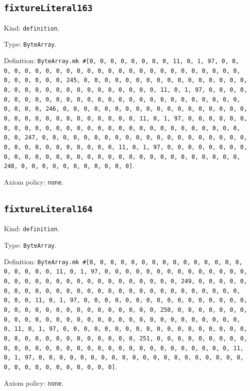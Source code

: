 \documentclass[11pt]{article}
\begin{document}
\subsection*{\texttt{fixtureLiteral163}}
\noindent Kind: \texttt{definition}.\par
\noindent Type: \texttt{ByteArray}.\par
\noindent Definition: \texttt{ByteArray.mk \#[0, 0, 0, 0, 0, 0, 0, 0, 11, 0, 1, 97, 0, 0, 0, 0, 0, 0, 0, 0, 0, 0, 0, 0, 0, 0, 0, 0, 0, 0, 0, 0, 0, 0, 0, 0, 0, 0, 0, 0, 0, 0, 0, 245, 0, 0, 0, 0, 0, 0, 0, 0, 0, 0, 0, 0, 0, 0, 0, 0, 0, 0, 0, 0, 0, 0, 0, 0, 0, 0, 0, 0, 0, 0, 0, 11, 0, 1, 97, 0, 0, 0, 0, 0, 0, 0, 0, 0, 0, 0, 0, 0, 0, 0, 0, 0, 0, 0, 0, 0, 0, 0, 0, 0, 0, 0, 0, 0, 0, 0, 246, 0, 0, 0, 0, 0, 0, 0, 0, 0, 0, 0, 0, 0, 0, 0, 0, 0, 0, 0, 0, 0, 0, 0, 0, 0, 0, 0, 0, 0, 0, 0, 11, 0, 1, 97, 0, 0, 0, 0, 0, 0, 0, 0, 0, 0, 0, 0, 0, 0, 0, 0, 0, 0, 0, 0, 0, 0, 0, 0, 0, 0, 0, 0, 0, 0, 0, 247, 0, 0, 0, 0, 0, 0, 0, 0, 0, 0, 0, 0, 0, 0, 0, 0, 0, 0, 0, 0, 0, 0, 0, 0, 0, 0, 0, 0, 0, 0, 0, 11, 0, 1, 97, 0, 0, 0, 0, 0, 0, 0, 0, 0, 0, 0, 0, 0, 0, 0, 0, 0, 0, 0, 0, 0, 0, 0, 0, 0, 0, 0, 0, 0, 0, 0, 248, 0, 0, 0, 0, 0, 0, 0, 0, 0, 0, 0]}.\par
\noindent Axiom policy: \texttt{none}.\par
\subsection*{\texttt{fixtureLiteral164}}
\noindent Kind: \texttt{definition}.\par
\noindent Type: \texttt{ByteArray}.\par
\noindent Definition: \texttt{ByteArray.mk \#[0, 0, 0, 0, 0, 0, 0, 0, 0, 0, 0, 0, 0, 0, 0, 0, 0, 0, 0, 0, 11, 0, 1, 97, 0, 0, 0, 0, 0, 0, 0, 0, 0, 0, 0, 0, 0, 0, 0, 0, 0, 0, 0, 0, 0, 0, 0, 0, 0, 0, 0, 0, 0, 0, 0, 249, 0, 0, 0, 0, 0, 0, 0, 0, 0, 0, 0, 0, 0, 0, 0, 0, 0, 0, 0, 0, 0, 0, 0, 0, 0, 0, 0, 0, 0, 0, 0, 11, 0, 1, 97, 0, 0, 0, 0, 0, 0, 0, 0, 0, 0, 0, 0, 0, 0, 0, 0, 0, 0, 0, 0, 0, 0, 0, 0, 0, 0, 0, 0, 0, 0, 0, 250, 0, 0, 0, 0, 0, 0, 0, 0, 0, 0, 0, 0, 0, 0, 0, 0, 0, 0, 0, 0, 0, 0, 0, 0, 0, 0, 0, 0, 0, 0, 0, 11, 0, 1, 97, 0, 0, 0, 0, 0, 0, 0, 0, 0, 0, 0, 0, 0, 0, 0, 0, 0, 0, 0, 0, 0, 0, 0, 0, 0, 0, 0, 0, 0, 0, 0, 251, 0, 0, 0, 0, 0, 0, 0, 0, 0, 0, 0, 0, 0, 0, 0, 0, 0, 0, 0, 0, 0, 0, 0, 0, 0, 0, 0, 0, 0, 0, 0, 11, 0, 1, 97, 0, 0, 0, 0, 0, 0, 0, 0, 0, 0, 0, 0, 0, 0, 0, 0, 0, 0, 0, 0, 0, 0, 0, 0, 0, 0, 0, 0, 0, 0, 0]}.\par
\noindent Axiom policy: \texttt{none}.\par
\end{document}
